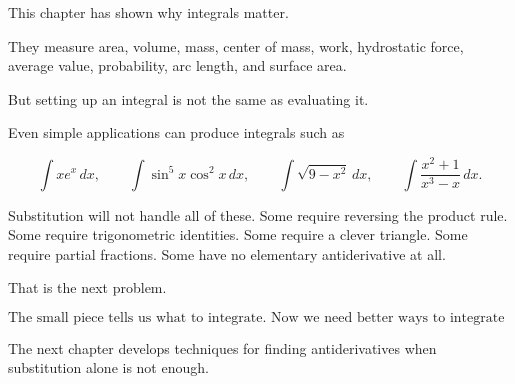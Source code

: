 This chapter has shown why integrals matter.

They measure area, volume, mass, center of mass, work, hydrostatic force, average
value, probability, arc length, and surface area.

But setting up an integral is not the same as evaluating it.

Even simple applications can produce integrals such as

\[
\int x e^x\,dx,
\qquad
\int \sin^5 x\cos^2 x\,dx,
\qquad
\int \sqrt{9-x^2}\,dx,
\qquad
\int \frac{x^2+1}{x^3-x}\,dx.
\]

Substitution will not handle all of these.  Some require reversing the product rule.
Some require trigonometric identities.  Some require a clever triangle.  Some require
partial fractions.  Some have no elementary antiderivative at all.

That is the next problem.

\[
\boxed{
\text{The small piece tells us what to integrate.  Now we need better ways to integrate it.}
}
\]

The next chapter develops techniques for finding antiderivatives when substitution alone
is not enough.

